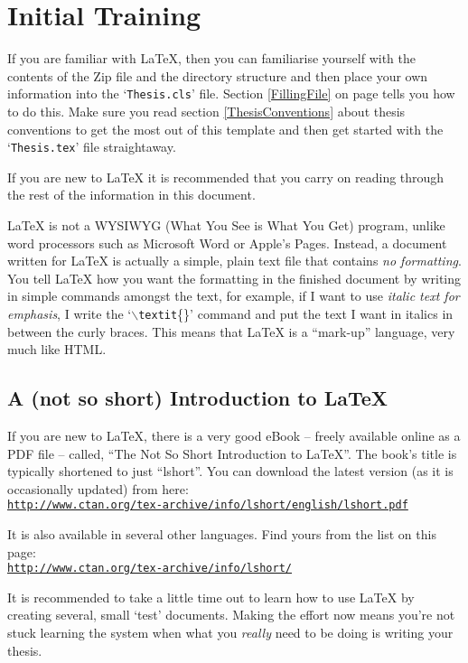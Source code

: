 \section{Initial Training}
If you are familiar with \LaTeX{}, then you can familiarise yourself with the contents of the Zip file and the directory structure and then place your own information into the `\texttt{Thesis.cls}' file. Section \ref{FillingFile} on page \pageref{FillingFile} tells you how to do this. Make sure you read section \ref{ThesisConventions} about thesis conventions to get the most out of this template and then get started with the `\texttt{Thesis.tex}' file straightaway.

If you are new to \LaTeX{} it is recommended that you carry on reading through the rest of the information in this document.

\LaTeX{} is not a WYSIWYG (What You See is What You Get) program, unlike word processors such as Microsoft Word or Apple's Pages. Instead, a document written for \LaTeX{} is actually a simple, plain text file that contains \emph{no formatting}. You tell \LaTeX{} how you want the formatting in the finished document by writing in simple commands amongst the text, for example, if I want to use \textit{italic text for emphasis}, I write the `$\backslash$\texttt{textit}\{\}' command and put the text I want in italics in between the curly braces. This means that \LaTeX{} is a ``mark-up'' language, very much like HTML.

\subsection{A (not so short) Introduction to \LaTeX{}}

If you are new to \LaTeX{}, there is a very good eBook -- freely available online as a PDF file -- called, ``The Not So Short Introduction to \LaTeX{}''. The book's title is typically shortened to just ``lshort''. You can download the latest version (as it is occasionally updated) from here:\\
\href{http://www.ctan.org/tex-archive/info/lshort/english/lshort.pdf}{\texttt{http://www.ctan.org/tex-archive/info/lshort/english/lshort.pdf}}

It is also available in several other languages. Find yours from the list on this page:\\
\href{http://www.ctan.org/tex-archive/info/lshort/}{\texttt{http://www.ctan.org/tex-archive/info/lshort/}}

It is recommended to take a little time out to learn how to use \LaTeX{} by creating several, small `test' documents. Making the effort now means you're not stuck learning the system when what you \emph{really} need to be doing is writing your thesis.

